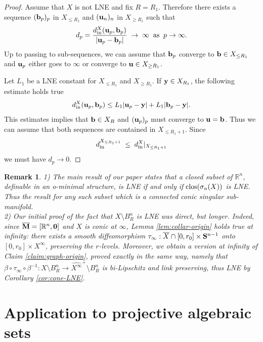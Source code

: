 \documentclass[11pt]{amsart}
\newtheorem{remark}[theorem]{Remark}
\newcommand{\field}[1]{\mathbb{#1}}
\newcommand{\R}{\field{R}}
\newcommand{\wh}[1]{\widehat{#1}}
\newcommand{\bb}{{\bf b}}
\newcommand{\bbo}{{\bf 0}}
\newcommand{\bMbar}{\overline{\bf M}}
\newcommand{\bS}{{\bf S}}
\newcommand{\bu}{{\bf u}}
\newcommand{\by}{{\bf y}}
\newcommand{\clos}{{\rm clos}}
\newcommand{\inn}{{{\rm in}}}
\newcommand{\ovX}{{\overline{X}}}
\newcommand{\Rn}{{\R^n}}
\newcommand{\sgm}{\sigma}
\numberwithin{equation}{section}
\numberwithin{equation}{section}
\begin{document}
\begin{proof}
		\bigskip
		Assume that $X$ is not LNE and fix $R=R_1$. 
		Therefore there exists a sequence $(\bb_p)_p$ in $X_{\leq R_1}$ and 
		$(\bu_n)_n$ in $X_{\geq R_1}$ such that 
		$$
		d_p = \frac{d_\inn^X(\bu_p,\bb_p)}{|\bu_p - \bb_p|} \; \to \; \infty
		\;\; {\rm as} \;\; p \to \infty. 
		$$
		Up to passing to sub-sequences, we can assume that $\bb_p$ converge to 
		$\bb\in X_{\leq R_1}$ and $\bu_p$ either goes to $\infty$ or converge to
		$\bu \in X_{\geq R_1}$.
		
		Let $L_1$ be a LNE constant for $X_{\leq R_1}$ and $X_{\geq R_1}$. If $\by 
		\in X_{R_1}$, the following estimate holds true
		$$
		d_\inn^X(\bu_p,\bb_p) \leq L_1 |\bu_p - \by| + L_1 |\bb_p - \by|.
		$$
		This estimates implies that $\bb \in X_R$ and $(\bu_p)_p$ must converge 
		to $\bu = \bb$. 
		Thus we can assume that both sequences are contained in $X_{\leq R_1 +1}$.
		Since 
		$$
		d_\inn^{X_{\leq R_1 +1}} \; \leq \; d_\inn^X|_{X_{\leq R_1 +1}}
		$$
		we must have $d_p \to 0$. 
	\end{proof}
	\begin{remark}
		1) The main result of our paper \cite{CoGrMi2} states that a closed subset
		of $\Rn$, definable in an o-minimal structure, is LNE if and only if $\clos 
		(\sgm_n(X))$ is LNE. 
		Thus the result for any such subset which is a connected 
		conic singular sub-manifold.
		\\
		2) Our initial proof of the fact that $X \setminus B_R^n$ is LNE was direct,
		but longer. 
		Indeed, since $\bMbar = [\Rn,\bbo]$ and $X$ is conic at $\infty$, Lemma 
		\ref{lem:collar-origin} holds true at infinity: there exists a 
		smooth diffeomorphism $\tau_\infty :\ovX \cap [0,r_0]\times \bS^{n-1}$ onto 
		$[0,r_0]\times X^\infty$, preserving the $r$-levels. Moreover, we obtain a 
		version at infinity of Claim \ref{claim:graph-origin}, proved exactly in the 
		same way, 
		namely that $\beta \circ \tau_\infty \circ \beta^{-1} : X \setminus B_R^n
		\to \wh{X^\infty}^+  \setminus B_R^n$ is bi-Lipschitz and link preserving, 
		thus LNE by Corollary \ref{cor:cone-LNE}.
	\end{remark}
	
	



\section{Application to projective algebraic sets}\label{section:PPoV}
%
%
\end{document}
